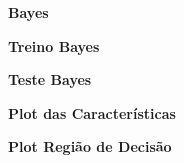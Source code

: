 \documentclass[a4paper]{article}
\begin{document}
\textbf{Bayes}


\newpage

\textbf{Treino Bayes}


\newpage

\begin{description}
\item[] 
\end{description}

\textbf{Teste Bayes}



\begin{description}
\item[] 
\end{description}

\newpage

\textbf{Plot das Características}


\begin{description}
\item[] 
\end{description}

\newpage

\textbf{Plot Região de Decisão}

\end{document}

